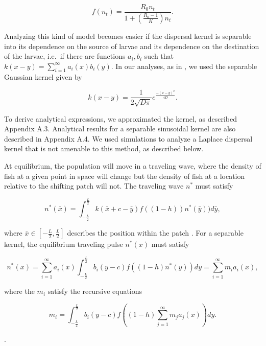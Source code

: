 \documentclass[12pt,english]{article}
\begin{document}
\begin{spacing}{1.9}
\begin{flushleft}
\[f(n_t)=\frac{R_0n_t}{1+\left(\frac{R_0-1}{K}\right)n_t}.\]  

\noindent  Analyzing this kind of model becomes easier if the dispersal kernel is separable into its dependence on the source of larvae and its dependence on the destination of the larvae, i.e.~if there are functions $a_i, b_i$ such that $k(x- y) = \sum^\infty_{i=1} a_i(x)b_i(y)$.  In our analyses, as in \cite{Latore:1998fk}, we used the separable Gaussian kernel given by

\[k(x-y)=\frac{1}{2\sqrt{D\pi}}e^{\frac{-(x-y)^2}{4D}}.\]

\noindent To derive analytical expressions, we approximated the kernel, as described Appendix A.3.
Analytical results for a separable sinusoidal kernel are also described in Appendix A.4.  
We used simulations to analyze a Laplace dispersal kernel that is not amenable to this method, as described below.  

At equilibrium, the population will move in a traveling wave, where the density of fish at a given point in space will change but the density of fish at a location relative to the shifting patch will not. The traveling wave $n^*$ must satisfy

\begin{equation}
n^*(\bar{x})=\int^{\frac{L}{2}}_{-\frac{L}{2}}k(\bar{x}+c-\bar{y})f((1-h))n^*(\bar{y}))d
\bar{y}, \label{traveling_pulse}
\end{equation}

\noindent where $\bar{x}\in\left[-\frac{L}{2}, \frac{L}{2}\right]$ describes the position within the patch \citep{ZhouKot2011}. For a separable kernel, the equilibrium traveling pulse $n^*(x)$ must satisfy 

\begin{equation}
n^*(x)=\sum^\infty_{i=1}
a_i(x)\int^{\frac{L}{2}}_{-\frac{L}{2}}b_i(y-c)f((1-h)n^*(y))dy=\sum^\infty_{i=1}m_ia_i(x), \label{separable_integrodifference}
\end{equation}

\noindent where the $m_i$ satisfy the recursive equations

\begin{equation}
m_i=\int^{\frac{L}{2}}_{-\frac{L}{2}}b_i(y-c)f\left((1-h)\sum^\infty_{j=1}m_ja_j(x)\right)
dy. \label{recursive_m}
\end{equation}

\noindent \citep{Latore:1998fk}.


\end{flushleft}
\end{spacing}
\end{document}
